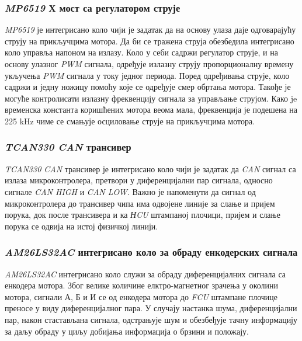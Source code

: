 \documentclass{article}
\begin{document}
\subsubsection{\textit{MP6519} Х мост са регулатором струје}
\textit{MP6519} је интегрисано коло чији је задатак да на основу улаза даје одговарајућу струју на прикључцима мотора. Да би се 
тражена струја обезбедила интегрисано коло управља напоном на излазу. Коло у 
себи садржи регулатор струје, и на основу улазног \textit{PWM} сигнала, одређује излазну струју пропорционалну времену укључења
\textit{PWM} сигнала у току једног периода. Поред одређивања струје, коло садржи и једну ножицу помоћу које се одређује смер
обртања мотора. Такође је могуће контролисати излазну фреквенцију сигнала за управљање струјом. Како je временска константа 
коришћених мотора веома мала, фреквенција је подешена на 225 kHz чиме се смањује осциловање струје на прикључцима мотора.

\subsubsection{\textit{TCAN330 CAN} трансивер}
\textit{TCAN330 CAN} трансивер је интегрисано коло чији је задатак да \textit{CAN} сигнал са излаза микроконтролера, претвори 
у диференцијални пар сигнала, односно сигнале \textit{CAN HIGH} и \textit{CAN LOW}. Важно је напоменути да сигнал од микроконтролера 
до трансивер чипа има одвојене линије за слање и пријем порука, док после трансивера и ка \textit{НCU} штампаној плочици, пријем и 
слање порука се одвија на истој физичкој линији.

\subsubsection{\textit{AM26LS32AC} интегрисано коло за обраду енкодерских сигнала}
\textit{AM26LS32AC} интегрисано коло служи за обраду диференцијалних сигнала са енкодера мотора. Због велике
количине елктро-магнетног зрачења у околини мотора, сигнали А, Б и И се од енкодера мотора до \textit{FCU} 
штампане плочице преносе у виду диференцијалног пара. У случају настанка шума, диференцијални пар, након 
стастављана сигнала, одстрањује шум и обезбеђује тачну информацију за даљу обраду у циљу добијања информација 
о брзини и положају.
\end{document}
